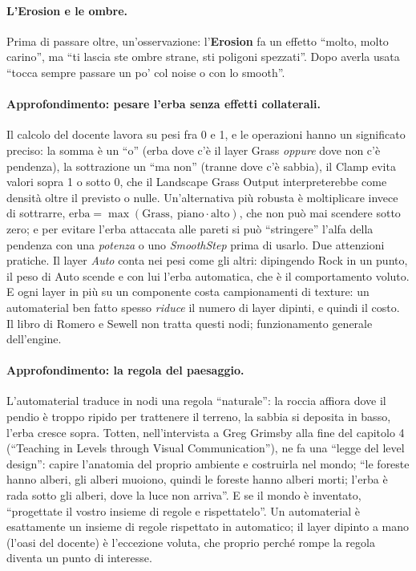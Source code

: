 \paragraph{L'Erosion e le ombre.} Prima di passare oltre, un'osservazione: l'\textbf{Erosion}
fa un effetto ``molto, molto carino'', ma ``ti lascia ste ombre strane, sti poligoni
spezzati''. Dopo averla usata ``tocca sempre passare un po' col noise o con lo smooth''.

\paragraph{Approfondimento: pesare l'erba senza effetti collaterali.} Il calcolo del docente
lavora su pesi fra 0 e 1, e le operazioni hanno un significato preciso: la somma è un ``o''
(erba dove c'è il layer Grass \emph{oppure} dove non c'è pendenza), la sottrazione un ``ma
non'' (tranne dove c'è sabbia), il Clamp evita valori sopra 1 o sotto 0, che il Landscape
Grass Output interpreterebbe come densità oltre il previsto o nulle. Un'alternativa più
robusta è moltiplicare invece di sottrarre, $\text{erba} = \max(\text{Grass},\
\text{piano}\cdot\text{alto})$, che non può mai scendere sotto zero; e per evitare l'erba
attaccata alle pareti si può ``stringere'' l'alfa della pendenza con una \emph{potenza} o uno
\emph{SmoothStep} prima di usarlo. Due attenzioni pratiche. Il layer \emph{Auto} conta nei
pesi come gli altri: dipingendo Rock in un punto, il peso di Auto scende e con lui l'erba
automatica, che è il comportamento voluto. E ogni layer in più su un componente costa
campionamenti di texture: un automaterial ben fatto spesso \emph{riduce} il numero di layer
dipinti, e quindi il costo. Il libro di Romero e Sewell non tratta questi nodi; funzionamento
generale dell'engine.

\paragraph{Approfondimento: la regola del paesaggio.} L'automaterial traduce in nodi una
regola ``naturale'': la roccia affiora dove il pendio è troppo ripido per trattenere il
terreno, la sabbia si deposita in basso, l'erba cresce sopra. Totten, nell'intervista a Greg
Grimsby alla fine del capitolo 4 (``Teaching in Levels through Visual Communication''), ne
fa una ``legge del level design'': capire l'anatomia del proprio ambiente e costruirla nel
mondo; ``le foreste hanno alberi, gli alberi muoiono, quindi le foreste hanno alberi
morti; l'erba è rada sotto gli alberi, dove la luce non arriva''. E se il mondo è inventato,
``progettate il vostro insieme di regole e rispettatelo''. Un automaterial è esattamente un
insieme di regole rispettato in automatico; il layer dipinto a mano (l'oasi del docente) è
l'eccezione voluta, che proprio perché rompe la regola diventa un punto di interesse.

